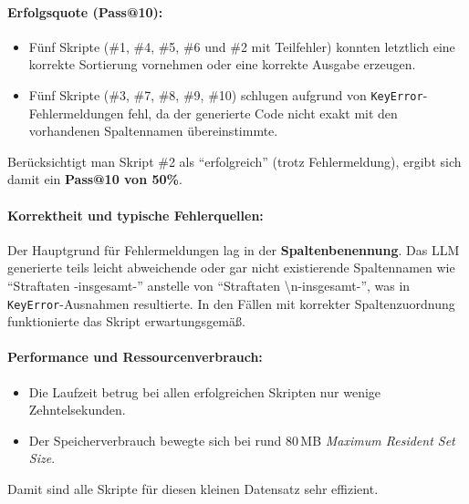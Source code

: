 \documentclass[11pt,a4paper]{article}
\begin{document}
\paragraph{Erfolgsquote (Pass@10):}
\begin{itemize}
    \item Fünf Skripte (\#1, \#4, \#5, \#6 und \#2 mit Teilfehler) konnten letztlich eine korrekte Sortierung vornehmen oder eine korrekte Ausgabe erzeugen.
    \item Fünf Skripte (\#3, \#7, \#8, \#9, \#10) schlugen aufgrund von \verb|KeyError|-Fehlermeldungen fehl, da der generierte Code nicht exakt mit den vorhandenen Spaltennamen übereinstimmte.
\end{itemize}
Berücksichtigt man Skript \#2 als \enquote{erfolgreich} (trotz Fehlermeldung), ergibt sich damit ein \textbf{Pass@10 von 50\%}.

\paragraph{Korrektheit und typische Fehlerquellen:}
Der Hauptgrund für Fehlermeldungen lag in der \textbf{Spaltenbenennung}. Das LLM generierte teils leicht abweichende oder gar nicht existierende Spaltennamen wie \enquote{Straftaten -insgesamt-} anstelle von \enquote{Straftaten \textbackslash n-insgesamt-}, was in \verb|KeyError|-Ausnahmen resultierte. In den Fällen mit korrekter Spaltenzuordnung funktionierte das Skript erwartungsgemäß.

\paragraph{Performance und Ressourcenverbrauch:}
\begin{itemize}
    \item Die Laufzeit betrug bei allen erfolgreichen Skripten nur wenige Zehntelsekunden.
    \item Der Speicherverbrauch bewegte sich bei rund 80\,MB \emph{Maximum Resident Set Size}.
\end{itemize}
Damit sind alle Skripte für diesen kleinen Datensatz sehr effizient.
\end{document}
